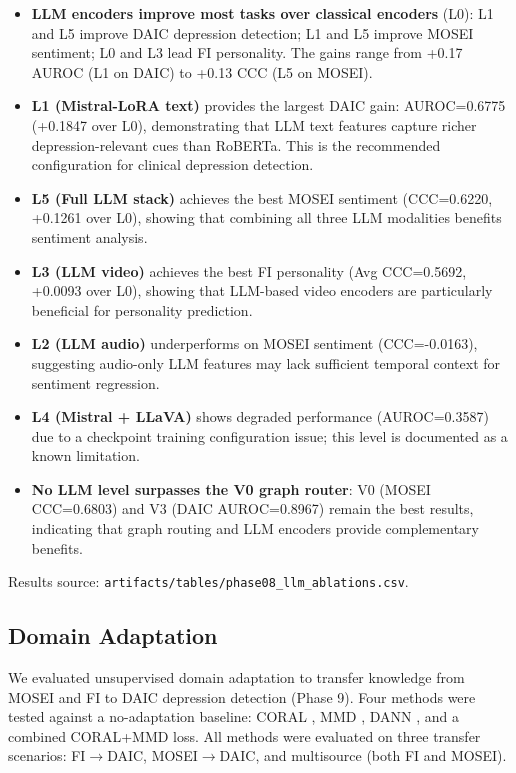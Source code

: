 \documentclass[12pt,oneside]{book}
\begin{document}
\begin{itemize}
\begin{itemize}
    \item \textbf{LLM encoders improve most tasks over classical encoders} (L0): L1 and L5 improve DAIC depression detection; L1 and L5 improve MOSEI sentiment; L0 and L3 lead FI personality. The gains range from +0.17 AUROC (L1 on DAIC) to +0.13 CCC (L5 on MOSEI).
    \item \textbf{L1 (Mistral-LoRA text)} provides the largest DAIC gain: AUROC=0.6775 (+0.1847 over L0), demonstrating that LLM text features capture richer depression-relevant cues than RoBERTa. This is the recommended configuration for clinical depression detection.
    \item \textbf{L5 (Full LLM stack)} achieves the best MOSEI sentiment (CCC=0.6220, +0.1261 over L0), showing that combining all three LLM modalities benefits sentiment analysis.
    \item \textbf{L3 (LLM video)} achieves the best FI personality (Avg CCC=0.5692, +0.0093 over L0), showing that LLM-based video encoders are particularly beneficial for personality prediction.
    \item \textbf{L2 (LLM audio)} underperforms on MOSEI sentiment (CCC=-0.0163), suggesting audio-only LLM features may lack sufficient temporal context for sentiment regression.
    \item \textbf{L4 (Mistral + LLaVA)} shows degraded performance (AUROC=0.3587) due to a checkpoint training configuration issue; this level is documented as a known limitation.
    \item \textbf{No LLM level surpasses the V0 graph router}: V0 (MOSEI CCC=0.6803) and V3 (DAIC AUROC=0.8967) remain the best results, indicating that graph routing and LLM encoders provide complementary benefits.
\end{itemize}

Results source: \texttt{artifacts/tables/phase08\_llm\_ablations.csv}.

\subsection{Domain Adaptation}
\label{sec:domain_adaptation}

We evaluated unsupervised domain adaptation to transfer knowledge from MOSEI and FI to DAIC depression detection (Phase 9). Four methods were tested against a no-adaptation baseline: CORAL \citep{sun2016deep}, MMD \citep{ganin2015dann}, DANN \citep{ganin2016dann}, and a combined CORAL+MMD loss. All methods were evaluated on three transfer scenarios: FI$\to$DAIC, MOSEI$\to$DAIC, and multisource (both FI and MOSEI).


\end{itemize}
\end{document}
